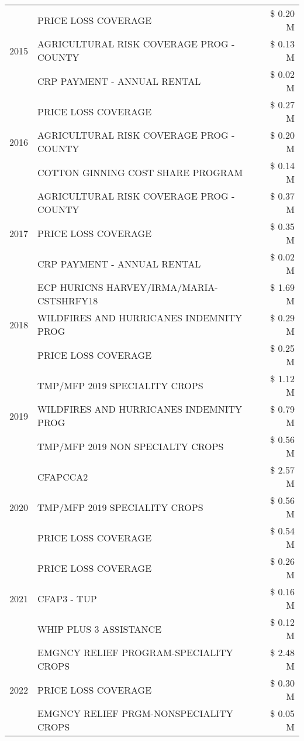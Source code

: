 \begin{tabular}{llr}
\cline{1-3}
\multirow[t]{3}{*}{2015} & PRICE LOSS COVERAGE & \$ 0.20 M \\
 & AGRICULTURAL RISK COVERAGE PROG - COUNTY & \$ 0.13 M \\
 & CRP PAYMENT - ANNUAL RENTAL & \$ 0.02 M \\
\cline{1-3}
\multirow[t]{3}{*}{2016} & PRICE LOSS COVERAGE & \$ 0.27 M \\
 & AGRICULTURAL RISK COVERAGE PROG - COUNTY & \$ 0.20 M \\
 & COTTON GINNING COST SHARE PROGRAM & \$ 0.14 M \\
\cline{1-3}
\multirow[t]{3}{*}{2017} & AGRICULTURAL RISK COVERAGE PROG - COUNTY & \$ 0.37 M \\
 & PRICE LOSS COVERAGE & \$ 0.35 M \\
 & CRP PAYMENT - ANNUAL RENTAL & \$ 0.02 M \\
\cline{1-3}
\multirow[t]{3}{*}{2018} & ECP HURICNS HARVEY/IRMA/MARIA-CSTSHRFY18 & \$ 1.69 M \\
 & WILDFIRES AND HURRICANES INDEMNITY PROG & \$ 0.29 M \\
 & PRICE LOSS COVERAGE & \$ 0.25 M \\
\cline{1-3}
\multirow[t]{3}{*}{2019} & TMP/MFP 2019 SPECIALITY CROPS & \$ 1.12 M \\
 & WILDFIRES AND HURRICANES INDEMNITY PROG & \$ 0.79 M \\
 & TMP/MFP 2019 NON SPECIALTY CROPS & \$ 0.56 M \\
\cline{1-3}
\multirow[t]{3}{*}{2020} & CFAPCCA2 & \$ 2.57 M \\
 & TMP/MFP 2019 SPECIALITY CROPS & \$ 0.56 M \\
 & PRICE LOSS COVERAGE & \$ 0.54 M \\
\cline{1-3}
\multirow[t]{3}{*}{2021} & PRICE LOSS COVERAGE & \$ 0.26 M \\
 & CFAP3 - TUP & \$ 0.16 M \\
 & WHIP PLUS 3 ASSISTANCE & \$ 0.12 M \\
\cline{1-3}
\multirow[t]{3}{*}{2022} & EMGNCY RELIEF PROGRAM-SPECIALITY CROPS & \$ 2.48 M \\
 & PRICE LOSS COVERAGE & \$ 0.30 M \\
 & EMGNCY RELIEF PRGM-NONSPECIALITY CROPS & \$ 0.05 M \\
\cline{1-3}
\bottomrule
\end{tabular}
